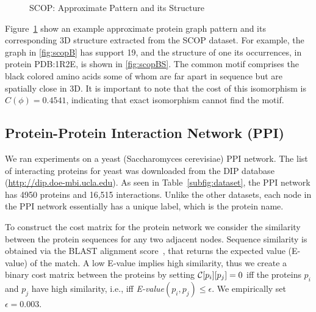 \begin{figure}[!ht]
  \vspace{-0.2in}
  \centerline{
	}
	\caption{SCOP: Approximate Pattern and its Structure}
	\label{fig:scoppats}
\end{figure}

\smallskip{}
Figure~\ref{fig:scoppats} show an example approximate protein graph
pattern and its corresponding 3D structure extracted from the SCOP
dataset.  
For example, the graph in \ref{fig:scopB} has support 19, and the
structure of one its occurrences, in protein PDB:1R2E, is shown in
\ref{fig:scopBS}. The common motif comprises the black colored amino
acids some of whom are far apart in sequence but are spatially close in 3D.
It is important to note that the cost of this isomorphism
is $C(\phi) = 0.4541$, indicating that exact isomorphism cannot find the
motif.

\subsection{Protein-Protein Interaction Network (PPI)} We ran
experiments on a yeast (Saccharomyces cerevisiae) PPI network. The list of
interacting proteins for yeast was downloaded from the DIP database
(\url{http://dip.doe-mbi.ucla.edu}). As seen in
Table~\ref{subfig:dataset}, the
PPI network has 4950 proteins and 16,515 interactions.  Unlike the other
datasets, each node in the PPI network essentially has a unique label,
which is the protein name.  

\smallskip{} 
To construct the cost matrix for the protein network we consider the
similarity between the protein sequences for any two adjacent nodes.
Sequence similarity is obtained via the BLAST alignment
score~\cite{altschul90}, that returns the expected value (E-value) of
the match. A low E-value implies high similarity, thus we create a
binary cost matrix between the proteins by setting
$\mathcal{C}[p_i][p_j] =0$ iff the proteins $p_i$ and $p_j$ have high
similarity, i.e., iff {\em E-value}$(p_i, p_j) \le \epsilon$. We empirically 
set $\epsilon = 0.003$.


